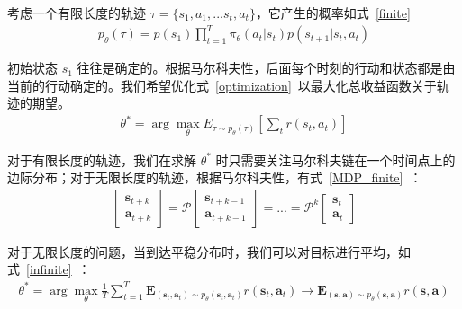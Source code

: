 考虑一个有限长度的轨迹 $\tau=\{s_1,a_1,...s_t,a_t\}$，它产生的概率如式~\eqref{finite}~
\begin{equation}
\label{finite}
\begin{aligned}
p_\theta(\tau) = p(s_1)\prod_{t=1}^T \pi_\theta(a_t|s_t)p(s_{t+1}|s_t,a_t)
\end{aligned}
\end{equation}

初始状态 $s_1$ 往往是确定的。根据马尔科夫性，后面每个时刻的行动和状态都是由当前的行动确定的。我们希望优化式~\eqref{optimization}~以最大化总收益函数关于轨迹的期望。
\begin{equation}
\label{optimization}
\begin{aligned}
\theta^* = \arg\max_\theta E_{\tau\sim p_\theta(\tau)}[\sum_t r(s_t, a_t)]
\end{aligned}
\end{equation}


对于有限长度的轨迹，我们在求解 $\theta^*$ 时只需要关注马尔科夫链在一个时间点上的边际分布；对于无限长度的轨迹，根据马尔科夫性，有式~\eqref{MDP_finite}~：
\begin{equation}
\label{MDP_finite}
\begin{aligned}
\left[\begin{array}{l}\mathbf{s}_{t+k}\\\mathbf{a}_{t+k}\end{array}\right]=\mathcal{P}\left[\begin{array}{l}\mathbf{s}_{t+k-1}\\\mathbf{a}_{t+k-1}\end{array}\right]=...=\mathcal{P}^k\left[\begin{array}{l}\mathbf{s}_{t}\\\mathbf{a}_{t}\end{array}\right]
\end{aligned}
\end{equation}

对于无限长度的问题，当到达平稳分布时，我们可以对目标进行平均，如式~\eqref{infinite}~：
\begin{equation}
\label{infinite}
\begin{aligned}
\theta^*=\arg\max_\theta\frac{1}{T}\sum_{t=1}^T\mathbf{E}_{(\mathbf{s}_t,\mathbf{a}_t)\sim p_\theta(\mathbf{s}_t,\mathbf{a}_t)}r(\mathbf{s}_t,\mathbf{a}_t)\rightarrow \mathbf{E}_{(\mathbf{s},\mathbf{a})\sim p_\theta(\mathbf{s},\mathbf{a})}r(\mathbf{s},\mathbf{a})
\end{aligned}
\end{equation}

